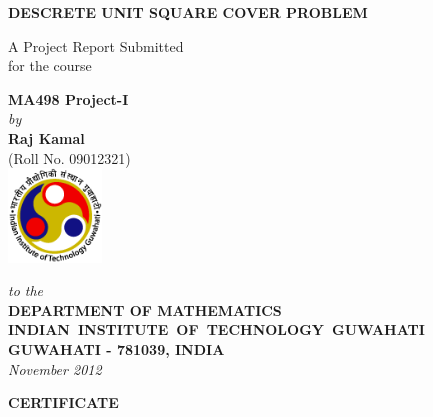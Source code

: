 \documentclass[10pt,a4wide]{report}
\theoremstyle{plain}
\theoremstyle{definition}
\theoremstyle{remark}
\begin{document}


\begin{titlepage}
\enlargethispage{3cm}

\begin{center}

\vspace*{-2cm}

\textbf{\Large DESCRETE UNIT SQUARE COVER PROBLEM}

\vfill

 A Project Report Submitted \\
 for the course \\
\vfill

 {\large \bf MA498 Project-I}\\[5pt]
\vfill
{\large \emph{by}}\\[10pt]
{\large\bf {Raj Kamal}}\\
{\large (Roll No. 09012321)}\\


\vfill
\includegraphics[height=2.5cm]{1.png}

\vspace*{0.5cm}

{\em\large to the}\\[10pt]
{\bf\large DEPARTMENT OF MATHEMATICS} \\[5pt]
{\bf\large \mbox{INDIAN INSTITUTE OF TECHNOLOGY GUWAHATI}}\\[5pt]
{\bf\large GUWAHATI - 781039, INDIA}\\[10pt]
{\it\large November 2012}
\end{center}

\end{titlepage}

\clearpage

 \setcounter{page}{2}
\begin{center}
{\Large{\bf{CERTIFICATE}}}
\end{center}
\end{document}
